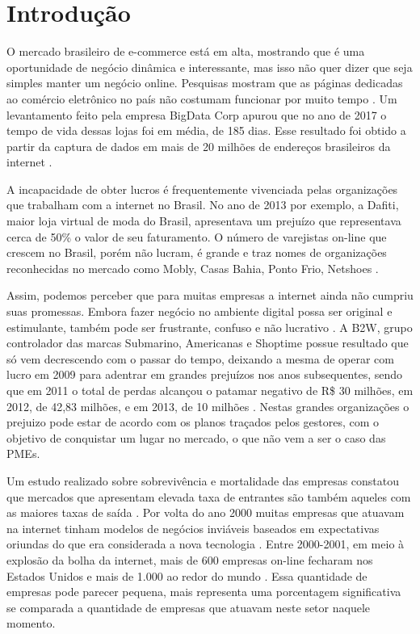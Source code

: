 
\chapter{Introdução}
\label{cap:intro}

O mercado brasileiro de e-commerce está em alta, mostrando que é uma oportunidade de negócio dinâmica e interessante, mas isso não quer dizer que seja simples manter um negócio online. Pesquisas mostram que as páginas dedicadas ao comércio eletrônico no país não costumam funcionar por muito tempo \cite{ecomnews} \cite{ecommerceschool2015}. Um levantamento feito pela empresa BigData Corp apurou que no ano de 2017 o tempo de vida dessas lojas foi em média, de 185 dias. Esse resultado foi obtido a partir da captura de dados em mais de 20 milhões de endereços brasileiros da internet \cite{sbvcsociedadebrasileiradevarejoeconsumo2017}.

A incapacidade de obter lucros é frequentemente vivenciada pelas organizações que trabalham com a internet no Brasil. No ano de 2013 por exemplo, a Dafiti, maior loja virtual de moda do Brasil, apresentava um prejuízo que representava cerca de 50\% o valor de seu faturamento. O número de varejistas on-line que crescem no Brasil, porém não lucram, é grande e traz nomes de organizações reconhecidas no mercado como Mobly, Casas Bahia, Ponto Frio, Netshoes \cite{rosanasantarosa2016}. 

Assim, podemos perceber que para muitas empresas a internet ainda não cumpriu suas promessas. Embora fazer negócio no ambiente digital possa ser original e estimulante, também pode ser frustrante, confuso e não lucrativo \cite{albertina.l.2010}. A B2W, grupo controlador das marcas Submarino, Americanas e Shoptime possue resultado que só vem decrescendo com o passar do tempo, deixando a mesma de operar com lucro em 2009 para adentrar em grandes prejuízos nos anos subsequentes, sendo que em 2011 o total de perdas alcançou o patamar negativo de R\$ 30 milhões, em 2012, de 42,83 milhões, e em 2013, de 10 milhões \cite{freitasc.2014}. Nestas grandes organizações o prejuizo pode estar de acordo com os planos traçados pelos gestores, com o objetivo de conquistar um lugar no mercado, o que não vem a ser o caso das PMEs.

Um estudo realizado sobre sobrevivência e mortalidade das empresas constatou que mercados que apresentam elevada taxa de entrantes são também aqueles com as maiores taxas de saída \cite{mourao2010}. Por volta do ano 2000 muitas empresas que atuavam na internet tinham modelos de negócios inviáveis baseados em expectativas oriundas do que era considerada a nova tecnologia \cite{motta2013}. Entre 2000-2001, em meio à explosão da bolha da internet, mais de 600 empresas on-line fecharam nos Estados Unidos e mais de 1.000 ao redor do mundo \cite{rosanasantarosa2016}. Essa quantidade de empresas pode parecer pequena, mais representa uma porcentagem significativa se comparada a quantidade de empresas que atuavam neste setor naquele momento. 

